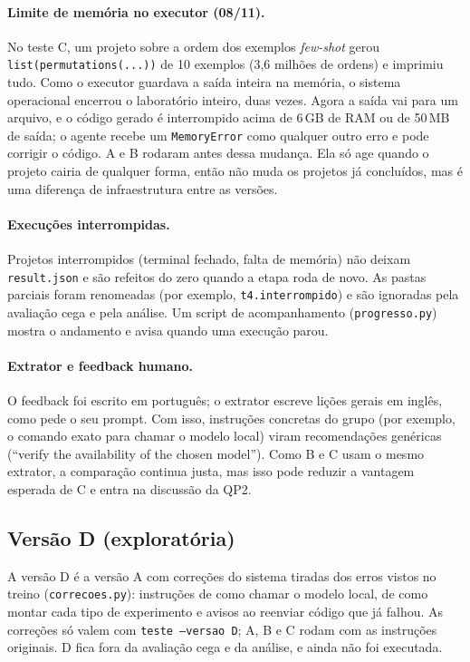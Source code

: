 \documentclass[11pt,a4paper]{article}
\begin{document}
\paragraph{Limite de memória no executor (08/11).} No teste C, um projeto sobre a ordem dos
exemplos \emph{few-shot} gerou \texttt{list(permutations(...))} de 10 exemplos (3,6 milhões de
ordens) e imprimiu tudo. Como o executor guardava a saída inteira na memória, o sistema
operacional encerrou o laboratório inteiro, duas vezes. Agora a saída vai para um arquivo, e o
código gerado é interrompido acima de 6\,GB de RAM ou de 50\,MB de saída; o agente recebe um
\texttt{MemoryError} como qualquer outro erro e pode corrigir o código. A e B rodaram antes
dessa mudança. Ela só age quando o projeto cairia de qualquer forma, então não muda os projetos
já concluídos, mas é uma diferença de infraestrutura entre as versões.

\paragraph{Execuções interrompidas.} Projetos interrompidos (terminal fechado, falta de
memória) não deixam \texttt{result.json} e são refeitos do zero quando a etapa roda de novo. As
pastas parciais foram renomeadas (por exemplo, \texttt{t4.interrompido}) e são ignoradas pela
avaliação cega e pela análise. Um script de acompanhamento (\texttt{progresso.py}) mostra o
andamento e avisa quando uma execução parou.

\paragraph{Extrator e feedback humano.} O feedback foi escrito em português; o extrator escreve
lições gerais em inglês, como pede o seu prompt. Com isso, instruções concretas do grupo (por
exemplo, o comando exato para chamar o modelo local) viram recomendações genéricas (``verify the
availability of the chosen model''). Como B e C usam o mesmo extrator, a comparação continua
justa, mas isso pode reduzir a vantagem esperada de C e entra na discussão da QP2.

\subsection{Versão D (exploratória)}
\label{sec:versaod}

A versão D é a versão A com correções do sistema tiradas dos erros vistos no treino
(\texttt{correcoes.py}): instruções de como chamar o modelo local, de como montar cada tipo de
experimento e avisos ao reenviar código que já falhou. As correções só valem com
\texttt{teste --versao D}; A, B e C rodam com as instruções originais. D fica fora da avaliação
cega e da análise, e ainda não foi executada.
\end{document}
